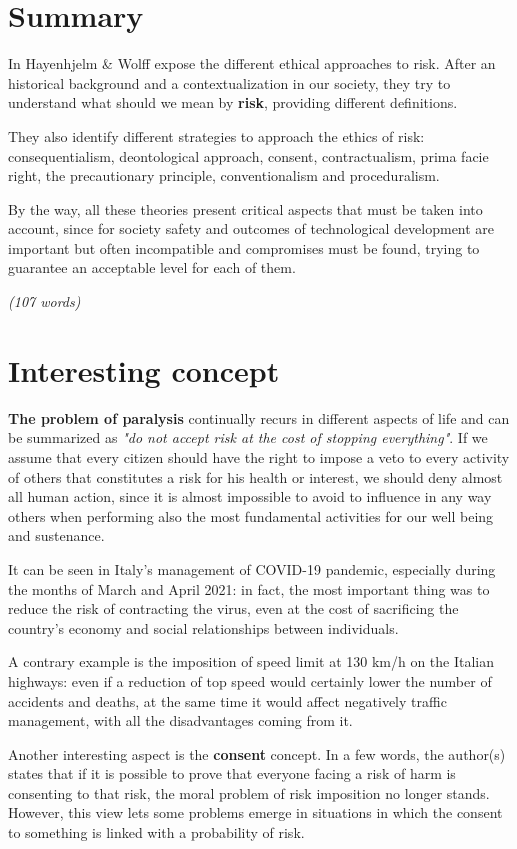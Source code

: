 \section{Summary}
In \cite{p1} Hayenhjelm \& Wolff expose the different ethical approaches to risk. After an historical background and a contextualization in our society, they try to understand what should we mean by \textbf{risk}, providing different definitions.

They also identify different strategies to approach the ethics of risk: consequentialism, deontological approach, consent, contractualism, prima facie right, the precautionary principle, conventionalism and proceduralism.

By the way, all these theories present critical aspects that must be taken into account, since for society safety and outcomes of technological development are important but often incompatible and compromises must be found, trying to guarantee an acceptable level for each of them.

\emph{(107 words)}

\section{Interesting concept}
\textbf{The problem of paralysis} continually recurs in different aspects of life and can be summarized as \textit{"do not accept risk at the cost of stopping everything"}. If we assume that every citizen should have the right to impose a veto to every activity of others that constitutes a risk for his health or interest, we should deny almost all human action, since it is almost impossible to avoid to influence in any way others when performing also the most fundamental activities for our well being and sustenance. 

It can be seen in Italy's management of COVID-19 pandemic, especially during the months of March and April 2021: in fact, the most important thing was to reduce the risk of contracting the virus, even at the cost of sacrificing the country's economy and social relationships between individuals.

A contrary example is the imposition of speed limit at 130 km/h on the Italian highways: even if a reduction of top speed would certainly lower the number of accidents and deaths, at the same time it would affect negatively traffic management, with all the disadvantages coming from it.

Another interesting aspect is the \textbf{consent} concept.
In a few words, the author(s) states that if it is possible to prove that everyone facing a risk of harm is consenting to that risk, the moral problem of risk imposition no longer stands. However, this view lets some problems emerge in situations in which the consent to something is linked with a probability of risk.


